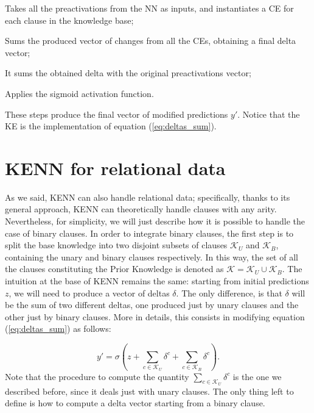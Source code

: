 \begin{enumerate}
	\item \textcolor{unipd}{Takes all the preactivations from the NN as inputs, and instantiates a CE for each clause in the knowledge base;
		\item Sums the produced vector of changes from all the CEs, obtaining a final delta vector;}

	\item It sums the obtained delta with the original preactivations vector;
	\item Applies the sigmoid activation function.
\end{enumerate}


 These steps produce the final vector of modified predictions $y'$. Notice that the KE is the implementation of equation (\ref{eq:deltas_sum}).
 
 \section{KENN for relational data}
 \label{sec:relational_kenn}
 
 \textcolor{unipd}{As we said, KENN can also handle relational data; specifically, thanks to its general approach, KENN can theoretically handle clauses with any arity. Nevertheless, for simplicity, we will just describe how it is possible to handle the case of binary clauses}. In order to integrate binary clauses, the first step is to split the base knowledge into \textcolor{unipd}{two disjoint subsets} of clauses $\mathcal{K}_U$ and $\mathcal{K}_B$, containing the unary and binary clauses respectively. In this way, the set of all the clauses constituting the Prior Knowledge is denoted as \mbox{$\mathcal{K} = \mathcal{K}_U \cup \mathcal{K}_B$}. The intuition at the base of KENN remains the same: starting from initial predictions $z$, we will need to produce a vector of deltas $\delta$. The only difference, is that $\delta$ will be the sum of two different deltas, one produced just by unary clauses and the other just by binary clauses. \textcolor{unipd}{More in details}, this consists in modifying equation (\ref{eq:deltas_sum}) as follows:
 
 \begin{equation}
 \label{eq:binary_kenn_eq}
 y'=\sigma(z + \sum_{c\in\mathcal{K}_U}\delta^c + \sum_{c\in\mathcal{K}_B}\delta^c).
 \end{equation}
Note that the procedure to compute the quantity $\sum_{c\in \mathcal{K}_U}\delta^c$ is the one we described before, since it deals just with unary clauses. The only thing left to define is how to compute a delta vector starting from a binary clause. 

